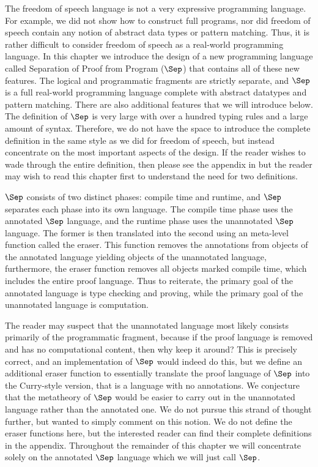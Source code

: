 The freedom of speech language is not a very expressive programming
language.  For example, we did not show how to construct full
programs, nor did freedom of speech contain any notion of abstract
data types or pattern matching.  Thus, it is rather difficult to
consider freedom of speech as a real-world programming language.  In
this chapter we introduce the design of a new programming language
called Separation of Proof from Program ($\Sep$) that contains all of
these new features.  The logical and programmatic fragments are
strictly separate, and $\Sep$ is a full real-world programming
language complete with abstract datatypes and pattern matching.  There
are also additional features that we will introduce below.  The
definition of $\Sep$ is very large with over a hundred typing rules
and a large amount of syntax.  Therefore, we do not have the space to
introduce the complete definition in the same style as we did for
freedom of speech, but instead concentrate on the most important
aspects of the design.  If the reader wishes to wade through the
entire definition, then please see the appendix in
\cite{Eades:2014-full} but the reader may wish to read this chapter
first to understand the need for two definitions.

$\Sep$ consists of two distinct phases: compile time and runtime, and
$\Sep$ separates each phase into its own language.  The compile time
phase uses the annotated $\Sep$ language, and the runtime phase uses
the unannotated $\Sep$ language.  The former is then translated into
the second using an meta-level function called the eraser.  This
function removes the annotations from objects of the annotated
language yielding objects of the unannotated language, furthermore, the
eraser function removes all objects marked compile time, which
includes the entire proof language.  Thus to reiterate, the primary
goal of the annotated language is type checking and proving, while the
primary goal of the unannotated language is computation.  

The reader may suspect that the unannotated language most likely
consists primarily of the programmatic fragment, because if the proof
language is removed and has no computational content, then why keep it
around?  This is precisely correct, and an implementation of $\Sep$
would indeed do this, but we define an additional eraser function to
essentially translate the proof language of $\Sep$ into the
Curry-style version, that is a language with no annotations.  We
conjecture that the metatheory of $\Sep$ would be easier to carry out
in the unannotated language rather than the annotated one.  We do not
pursue this strand of thought further, but wanted to simply comment on
this notion. We do not define the eraser functions here, but the
interested reader can find their complete definitions in the appendix.
Throughout the remainder of this chapter we will concentrate solely on
the annotated $\Sep$ language which we will just call $\Sep$.

